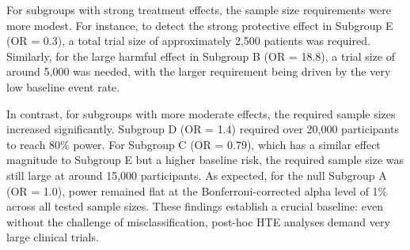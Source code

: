 \documentclass[
  letterpaper,
  DIV=11,
  numbers=noendperiod]{scrartcl}
\begin{document}
For subgroups with strong treatment effects, the sample size
requirements were more modest. For instance, to detect the strong
protective effect in Subgroup E (OR = 0.3), a total trial size of
approximately 2,500 patients was required. Similarly, for the large
harmful effect in Subgroup B (OR = 18.8), a trial size of around 5,000
was needed, with the larger requirement being driven by the very low
baseline event rate.

In contrast, for subgroups with more moderate effects, the required
sample sizes increased significantly. Subgroup D (OR = 1.4) required
over 20,000 participants to reach 80\% power. For Subgroup C (OR =
0.79), which has a similar effect magnitude to Subgroup E but a higher
baseline risk, the required sample size was still large at around 15,000
participants. As expected, for the null Subgroup A (OR = 1.0), power
remained flat at the Bonferroni-corrected alpha level of 1\% across all
tested sample sizes. These findings establish a crucial baseline: even
without the challenge of misclassification, post-hoc HTE analyses demand
very large clinical trials.
\end{document}
